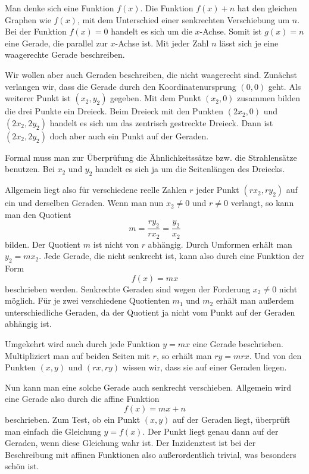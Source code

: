 \documentclass[a4paper,10pt,fleqn,twocolumn,twoside,dvipdfmx]{scrartcl}
\begin{document}
Man denke sich eine Funktion $f(x)$. Die Funktion $f(x)+n$ hat
den gleichen Graphen wie $f(x)$, mit dem Unterschied einer
senkrechten Verschiebung um $n$. Bei der Funktion $f(x)=0$
handelt es sich um die $x$-Achse. Somit ist $g(x)=n$ eine
Gerade, die parallel zur $x$-Achse ist. Mit jeder Zahl $n$ lässt
sich je eine waagerechte Gerade beschreiben.

Wir wollen aber auch Geraden beschreiben, die nicht waagerecht sind.
Zunächst verlangen wir, dass die Gerade durch den Koordinatenursprung $(0,0)$
geht. Als weiterer Punkt ist $(x_2,y_2)$ gegeben. Mit dem Punkt
$(x_2,0)$ zusammen bilden die drei Punkte ein Dreieck. Beim Dreieck
mit den Punkten $(2x_2,0)$ und $(2x_2,2y_2)$ handelt es sich
um das zentrisch gestreckte Dreieck. Dann ist $(2x_2,2y_2)$ doch
aber auch ein Punkt auf der Geraden.

Formal muss man zur Überprüfung die Ähnlichkeitssätze bzw. die
Strahlensätze benutzen. Bei $x_2$ und $y_2$ handelt es sich ja
um die Seitenlängen des Dreiecks.

Allgemein liegt also für verschiedene reelle Zahlen $r$
jeder Punkt $(rx_2,ry_2)$ auf ein und derselben Geraden.
Wenn man nun $x_2\ne 0$ und $r\ne 0$ verlangt, so kann man
den Quotient
\begin{equation}
m = \frac{ry_2}{rx_2} = \frac{y_2}{x_2}
\end{equation}
bilden. Der Quotient $m$ ist nicht von $r$ abhängig.
Durch Umformen erhält man $y_2=mx_2$. Jede Gerade, die nicht
senkrecht ist, kann also durch eine Funktion der Form
\begin{equation}
f(x)=mx
\end{equation}
beschrieben werden. Senkrechte Geraden sind wegen der Forderung
$x_2\ne 0$ nicht möglich. Für je zwei verschiedene Quotienten
$m_1$ und $m_2$ erhält man außerdem unterschiedliche Geraden,
da der Quotient ja nicht vom Punkt auf der Geraden abhängig ist.

Umgekehrt wird auch durch jede
Funktion $y=mx$ eine Gerade beschrieben. Multipliziert man auf
beiden Seiten mit $r$, so erhält man $ry=mrx$. Und von den Punkten
$(x,y)$ und $(rx,ry)$ wissen wir, dass sie auf einer Geraden liegen.

Nun kann man eine solche Gerade auch senkrecht verschieben. Allgemein
wird eine Gerade also durch die affine Funktion
\begin{equation}
f(x) = mx+n
\end{equation}
beschrieben. Zum Test, ob ein Punkt $(x,y)$ auf der Geraden liegt,
überprüft man einfach die Gleichung $y=f(x)$. Der Punkt liegt
genau dann auf der Geraden, wenn diese Gleichung wahr ist. Der
Inzidenztest ist bei der Beschreibung mit affinen Funktionen also
außerordentlich trivial, was besonders schön ist.
\end{document}
